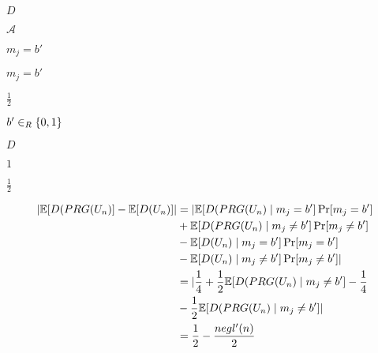 \documentclass[10pt]{book}
\begin{document}
\begin{mdSnippets}
\begin{mdInlineSnippet}[f623e75af30e62bbd73d6df5b50bb7b5]%
$D$\end{mdInlineSnippet}%
\begin{mdInlineSnippet}[ad70146b431bea9ae74cf8385470c544]%
$\mathcal{A}$\end{mdInlineSnippet}%
\begin{mdInlineSnippet}[5cc6382fe9a1ecdb87306389257ef647]%
$m_j = b'$\end{mdInlineSnippet}%
\begin{mdInlineSnippet}[5cc6382fe9a1ecdb87306389257ef647]%
$m_j = b'$\end{mdInlineSnippet}%
\begin{mdInlineSnippet}[93b05c90d14a117ba52da1d743a43ab1]%
$\frac{1}{2}$\end{mdInlineSnippet}%
\begin{mdInlineSnippet}[29d5113484ac4506f132e978d9eb1058]%
$b' \in_R \{0,1\}$\end{mdInlineSnippet}%
\begin{mdInlineSnippet}[f623e75af30e62bbd73d6df5b50bb7b5]%
$D$\end{mdInlineSnippet}%
\begin{mdInlineSnippet}[c4ca4238a0b923820dcc509a6f75849b]%
$1$\end{mdInlineSnippet}%
\begin{mdInlineSnippet}[93b05c90d14a117ba52da1d743a43ab1]%
$\frac{1}{2}$\end{mdInlineSnippet}%
\begin{mdDisplaySnippet}%
\[%
\begin{aligned}
|\E[D(PRG(U_n)] - \E[D(U_n)]| &=  |\E[D(PRG(U_n) \mid m_j = b']\Pr[m_j = b'] \\
&+\E[D(PRG(U_n) \mid m_j \neq b']\Pr[m_j \neq b'] \\
&-\E[D(U_n) \mid m_j = b']\Pr[m_j = b']\\
 &- \E[D(U_n) \mid m_j \neq b']\Pr[m_j \neq b']| \\
&= |\frac{1}{4} + \frac{1}{2}\E[D(PRG(U_n) \mid m_j \neq b'] - \frac{1}{4} \\
&- \frac{1}{2}\E[D(PRG(U_n) \mid m_j \neq b']| \\
&= \frac{1}{2} - \frac{negl'(n)}{2}

\end{aligned}\]
\end{mdDisplaySnippet}
\end{mdSnippets}
\end{document}
